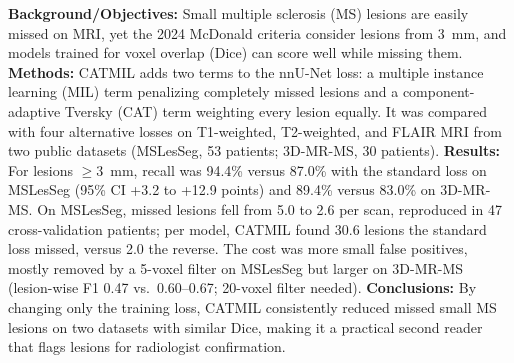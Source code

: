\textbf{Background/Objectives:} Small multiple sclerosis (MS) lesions are easily missed on MRI, yet the 2024 McDonald criteria consider lesions from 3~mm, and models trained for voxel overlap (Dice) can score well while missing them. \textbf{Methods:} CATMIL adds two terms to the nnU-Net loss: a multiple instance learning (MIL) term penalizing completely missed lesions and a component-adaptive Tversky (CAT) term weighting every lesion equally. It was compared with four alternative losses on T1-weighted, T2-weighted, and FLAIR MRI from two public datasets (MSLesSeg, 53 patients; 3D-MR-MS, 30 patients). \textbf{Results:} For lesions $\geq$3~mm, recall was 94.4\% versus 87.0\% with the standard loss on MSLesSeg (95\% CI +3.2 to +12.9 points) and 89.4\% versus 83.0\% on 3D-MR-MS. On MSLesSeg, missed lesions fell from 5.0 to 2.6 per scan, reproduced in 47 cross-validation patients; per model, CATMIL found 30.6 lesions the standard loss missed, versus 2.0 the reverse. The cost was more small false positives, mostly removed by a 5-voxel filter on MSLesSeg but larger on 3D-MR-MS (lesion-wise F1 0.47 vs.\ 0.60--0.67; 20-voxel filter needed). \textbf{Conclusions:} By changing only the training loss, CATMIL consistently reduced missed small MS lesions on two datasets with similar Dice, making it a practical second reader that flags lesions for radiologist confirmation.
